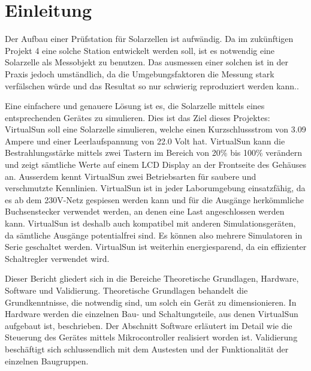 \section{Einleitung}

Der Aufbau einer Prüfstation für Solarzellen ist aufwändig. Da im zukünftigen Projekt 4 eine solche Station entwickelt werden soll, ist es notwendig eine Solarzelle als Messobjekt zu benutzen. Das ausmessen einer solchen ist in 
der Praxis jedoch umständlich, da die Umgebungsfaktoren die Messung stark verfälschen würde und das Resultat so nur schwierig reproduziert werden kann..


Eine einfachere und genauere Lösung ist es, die Solarzelle mittels eines entsprechenden Gerätes zu simulieren. Dies ist das Ziel dieses Projektes: VirtualSun soll eine Solarzelle simulieren, welche einen Kurzschlussstrom von 3.09 Ampere und einer Leerlaufspannung von 22.0 Volt hat. VirtualSun kann die Bestrahlungsstärke mittels zwei Tastern im Bereich von 20\% bis 100\% verändern und zeigt sämtliche Werte auf einem LCD Display an der Frontseite des Gehäuses an. Ausserdem kennt VirtualSun zwei Betriebsarten für saubere und verschmutzte Kennlinien. VirtualSun ist in jeder Laborumgebung einsatzfähig, da es ab dem 230V-Netz gespiesen werden kann und für die Ausgänge herkömmliche Buchsenstecker verwendet werden, an denen eine Last angeschlossen werden kann. VirtualSun ist deshalb auch kompatibel mit anderen Simulationsgeräten, da sämtliche Ausgänge potentialfrei sind. Es können also mehrere Simulatoren in Serie geschaltet werden.  VirtualSun ist weiterhin energiesparend, da ein effizienter Schaltregler verwendet wird. 

Dieser Bericht gliedert sich in
die Bereiche Theoretische Grundlagen, Hardware, Software und Validierung. Theoretische Grundlagen behandelt die Grundkenntnisse, die notwendig sind, um solch ein Gerät zu dimensionieren. In Hardware werden die einzelnen Bau- und Schaltungsteile, aus denen VirtualSun aufgebaut ist, beschrieben. Der Abschnitt Software erläutert im Detail wie die Steuerung des Gerätes mittels Mikrocontroller realisiert worden ist. Validierung beschäftigt sich schlussendlich mit dem Austesten und der Funktionalität der einzelnen Baugruppen.